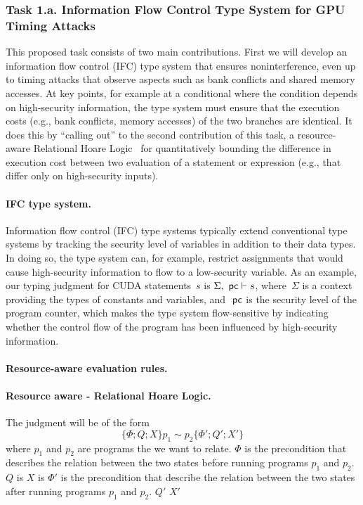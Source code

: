 \subsubsection{Task 1.a. Information Flow Control Type System for GPU Timing Attacks}

This proposed task consists of two main contributions.
%
First we will develop an information flow control (IFC) type system that ensures noninterference, even up to timing attacks that observe aspects such as bank conflicts and shared memory accesses.
%
At key points, for example at a conditional where the condition depends on high-security information, the type system must ensure that the execution costs (e.g., bank conflicts, memory accesses) of the two branches are identical.
%
It does this by ``calling out'' to the second contribution of this task,
a resource-aware Relational Hoare Logic~\cite{Relcost} for quantitatively bounding the difference in execution cost between two evaluation of a statement or expression (e.g., that differ only on high-security inputs).
%


\paragraph{IFC type system.}
Information flow control (IFC) type systems typically extend conventional type systems by tracking the security level of variables in addition to their data types.
%
In doing so, the type system can, for example, restrict assignments that would
cause high-security information to flow to a low-security variable.
%
As an example, our typing judgment for CUDA statements~$s$ is
$\Sigma, ~\mathsf{pc} \vdash s$,
where~$\Sigma$ is a context providing the types of constants and variables,
and $~\mathsf{pc}$ is the security level of the program counter, which makes the type
system flow-sensitive by indicating whether the control flow of the program
has been influenced by high-security information.


\paragraph{Resource-aware evaluation rules.}

\paragraph{Resource aware - Relational Hoare Logic.}
The judgment will be of the form 
%
\[\{\Phi; Q; X\} p_1 \sim p_2 \{\Phi'; Q'; X'\}\]
%
where $p_1$ and $p_2$ are programs the we want to relate.%
$\Phi$ is the precondition that describes the relation between the two states before running programs $p_1$ and $p_2$. 
%
$Q$ is
%
$X$ is
%
$\Phi'$ is the precondition that describe the relation between the two states after running programs $p_1$ and $p_2$.
%
$Q'$
%
$X'$

